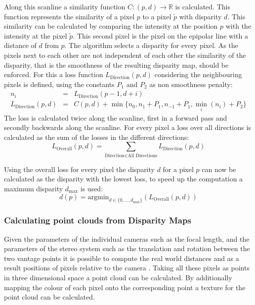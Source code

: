 Along this scanline a similarity function $C: (p,d) \to \mathbb{R}$ is calculated. This function represents the similarity of a pixel $p$ to a pixel $\tilde{p}$ with disparity $d$. 
This similarity can be calculated by comparing the intensity at the position $p$ with the intensity at the pixel $\tilde{p}$.
This second pixel is the pixel on the epipolar line with a distance of $d$ from $p$.
The algorithm selects a disparity for every pixel. As the pixels next to each other are not independent of each other the similarity of the disparity, that is the smoothness of the resulting disparity map, should be enforced. 
For this a loss function $L_\text{Direction}(p,d)$ considering the neighbouring pixels is defined, using the constants $P_1$ and $P_2$ as non smoothness penalty:
\begin{eqnarray}
    n_i &=& L_\text{Direction}(p-1,d+i) \\
    L_\text{Direction}(p,d) &=& C(p,d) + \min\{n_0, n_1 + P_1, n_{-1} + P_1, \min_i (n_i) + P_2\}
\end{eqnarray}
The loss is calculated twice along the scanline, first in a forward pass and secondly backwards along the scanline. For every pixel a loss over all directions is calculated as the sum of the losses in the different directions:
\begin{equation}
    L_\text{Overall}(p,d) = \sum_{\text{Direction} \in \text{All Directions}} L_\text{Direction}(p,d)
\end{equation}

Using the overall loss for every pixel the disparity $d$ for a pixel $p$ can now be calculated as the disparity with the lowest loss, to speed up the computation a maximum disparity $d_\text{max}$ is used:
\begin{equation}
    d(p) = \text{argmin}_{d \in \{0, \ldots, d_\text{max} \} } \left(L_\text{Overall}(p,d)\right)
\end{equation}



\subsubsection{Calculating point clouds from Disparity Maps} \label{sec:theor:disp2pc}
Given the parameters of the individual cameras such as the focal length, and the parameters of the stereo system such as the translation and rotation between the two vantage points it is possible to compute the real world distances and as a result positions of pixels relative to the camera \cite{opencvpc}. 
Taking all these pixels as points in three dimensional space a point cloud can be calculated.
By additionally mapping the colour of each pixel onto the corresponding point a texture for the point cloud can be calculated.

